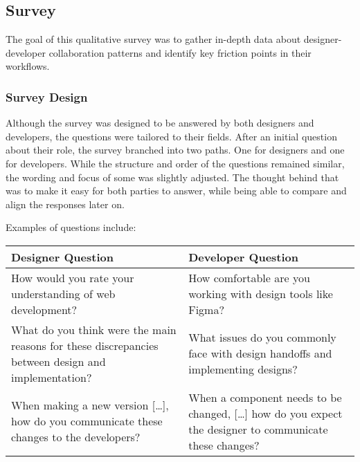 \newpage
\subsection{Survey}
The goal of this qualitative survey was to gather in-depth data about designer-developer
collaboration patterns and identify key friction points in their workflows.

\subsubsection{Survey Design}
Although the survey was designed to be answered by both designers and developers, the questions were
tailored to their fields. After an initial question about their role, the survey branched into two
paths. One for designers and one for developers. While the structure and order of the questions
remained similar, the wording and focus of some was slightly adjusted. The thought behind that was
to make it easy for both parties to answer, while being able to compare and align the responses
later on.

Examples of questions include: %
\begin{center}
    \begin{tabular}{|m{7.5cm}|m{7.5cm}|}
        \hline
        \textbf{Designer Question}                                                                         & \textbf{Developer Question}                                                                                \\
        \hline
        How would you rate your understanding of web development?                                          & How comfortable are you working with design tools like Figma?                                              \\
        \hline
        What do you think were the main reasons for these discrepancies between design and implementation? & What issues do you commonly face with design handoffs and implementing designs?                            \\
        \hline
        When making a new version [\dots], how do you communicate these changes to the developers?         & When a component needs to be changed, [\dots] how do you expect the designer to communicate these changes? \\
        \hline
    \end{tabular}
\end{center}

